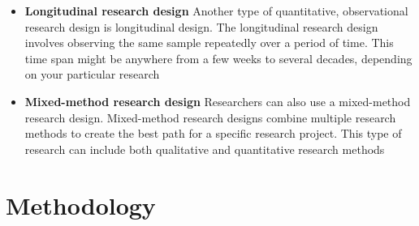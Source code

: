 \documentclass[conference]{IEEEtran}
\begin{document}
\begin{itemize}
				\item \textbf{Longitudinal research design}
						Another type of quantitative, observational research design is longitudinal design. The longitudinal research design involves observing the same sample repeatedly over a period of time. This time span might be anywhere from a few weeks to several decades, depending on your particular research
				\item \textbf{Mixed-method research design}
				Researchers can also use a mixed-method research design. Mixed-method research designs combine multiple research methods to create the best path for a specific research project. This type of research can include both qualitative and quantitative research methods
			
			
	
	
	

\end{itemize}


\section{\textbf{Methodology }}
\end{document}
